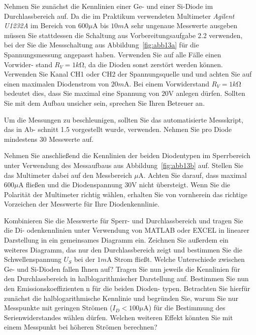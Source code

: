 \documentclass[10pt]{scrreprt}
\begin{document}
    Nehmen Sie zunächst die Kennlinien einer Ge- und einer Si-Diode im Durchlassbereich
    auf. Da die im Praktikum verwendeten Multimeter \textit{Agilent U1232A} im Bereich von $600\si{\mu \ampere}$
    bis $10\si{m\ampere}$ sehr ungenaue Messwerte ausgeben müssen Sie stattdessen die Schaltung aus
    Vorbereitungsaufgabe 2.2 verwenden, bei der Sie die Messschaltung aus Abbildung~\ref{fig:abb13a}
    für die Spannungsmessung angepasst haben. Verwenden Sie auf alle Fälle einen Vorwider-
    stand $R_V = 1\si{k\ohm}$, da die Dioden sonst zerstört werden können. Verwenden Sie Kanal CH1
    oder CH2 der Spannungsquelle und und achten Sie auf einen maximalen Diodenstrom
    von $20\si{m\ampere}$. Bei einem Vorwiderstand $R_V = 1\si{k\ohm}$ bedeutet dies, dass Sie maximal eine
    Spannung von $20\si{\volt}$ anlegen dürfen. Sollten Sie mit dem Aufbau unsicher sein, sprechen
    Sie Ihren Betreuer an.

    Um die Messungen zu beschleunigen, sollten Sie das automatisierte Messskript, das in Ab-
    schnitt 1.5 vorgestellt wurde, verwenden. Nehmen Sie pro Diode mindestens 30 Messwerte
    auf.

    Nehmen Sie anschließend die Kennlinien der beiden Diodentypen im Sperrbereich unter
    Verwendung des Messaufbaus aus Abbildung~\ref{fig:abb13b} auf. Stellen Sie das Multimeter dabei
    auf den Messbereich $\si{\mu \ampere}$. Achten Sie darauf, dass maximal $600\si{\mu \ampere}$ fließen und die
    Diodenspannung $30\si{\volt}$ nicht übersteigt. Wenn Sie die Polarität der Multimeter richtig wählen,
    erhalten Sie von vornherein das richtige Vorzeichen der Messwerte für Ihre Diodenkennlinie.

    Kombinieren Sie die Messwerte für Sperr- und Durchlassbereich und tragen Sie die Di-
    odenkennlinien unter Verwendung von MATLAB oder EXCEL in linearer Darstellung in
    ein gemeinsames Diagramm ein. Zeichnen Sie außerdem ein weiteres Diagramm, das nur
    den Durchlassbereich zeigt und bestimmen Sie die Schwellenspannung $U_S$ bei der $1\si{m\ampere}$
    Strom fließt. Welche Unterschiede zwischen Ge- und Si-Dioden fallen Ihnen auf?
    Tragen Sie nun jeweils die Kennlinien für den Durchlassbereich in halblogarithmischer
    Darstellung auf. Bestimmen Sie nun den Emissionskoeffizienten n für die beiden Dioden-
    typen. Betrachten Sie hierfür zunächst die halblogarithmische Kennlinie und begründen
    Sie, warum Sie nur Messpunkte mit geringen Strömen ($I_D < 100\si{\mu\ampere}$) für die Bestimmung
    des Serienwiderstandes wählen dürfen. Welchen weiteren Effekt könnten Sie mit einem
    Messpunkt bei höheren Strömen berechnen?
\end{document}
